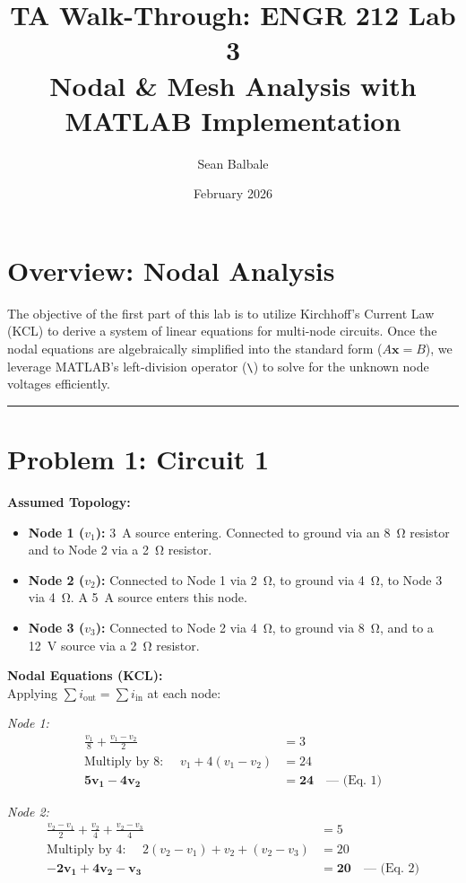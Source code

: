 \documentclass[11pt]{article}
\title{\textbf{TA Walk-Through: ENGR 212 Lab 3}\\Nodal \& Mesh Analysis with MATLAB Implementation}
\author{Sean Balbale}
\date{February 2026}
\begin{document}
\maketitle

\section*{Overview: Nodal Analysis}
The objective of the first part of this lab is to utilize Kirchhoff's Current Law (KCL) to derive a system of linear equations for multi-node circuits. Once the nodal equations are algebraically simplified into the standard form ($A \mathbf{x} = B$), we leverage MATLAB's left-division operator (\texttt{\textbackslash}) to solve for the unknown node voltages efficiently.

\hrule
\vspace{1em}

\section*{Problem 1: Circuit 1}

\textbf{Assumed Topology:}
\begin{itemize}
  \item \textbf{Node 1 ($v_1$):} \SI{3}{\ampere} source entering. Connected to ground via an \SI{8}{\ohm} resistor and to Node 2 via a \SI{2}{\ohm} resistor.
  \item \textbf{Node 2 ($v_2$):} Connected to Node 1 via \SI{2}{\ohm}, to ground via \SI{4}{\ohm}, to Node 3 via \SI{4}{\ohm}. A \SI{5}{\ampere} source enters this node.
  \item \textbf{Node 3 ($v_3$):} Connected to Node 2 via \SI{4}{\ohm}, to ground via \SI{8}{\ohm}, and to a \SI{12}{\volt} source via a \SI{2}{\ohm} resistor.
\end{itemize}

\textbf{Nodal Equations (KCL):} \\
Applying $\sum i_{\text{out}} = \sum i_{\text{in}}$ at each node:

\textit{Node 1:}
\begin{align*}
  \frac{v_1}{8} + \frac{v_1 - v_2}{2} &= 3 \\
  \text{Multiply by 8: } \quad v_1 + 4(v_1 - v_2) &= 24 \\
  \mathbf{5v_1 - 4v_2} &\mathbf{= 24} \quad \text{--- (Eq. 1)}
\end{align*}

\textit{Node 2:}
\begin{align*}
  \frac{v_2 - v_1}{2} + \frac{v_2}{4} + \frac{v_2 - v_3}{4} &= 5 \\
  \text{Multiply by 4: } \quad 2(v_2 - v_1) + v_2 + (v_2 - v_3) &= 20 \\
  \mathbf{-2v_1 + 4v_2 - v_3} &\mathbf{= 20} \quad \text{--- (Eq. 2)}
\end{align*}
\end{document}
